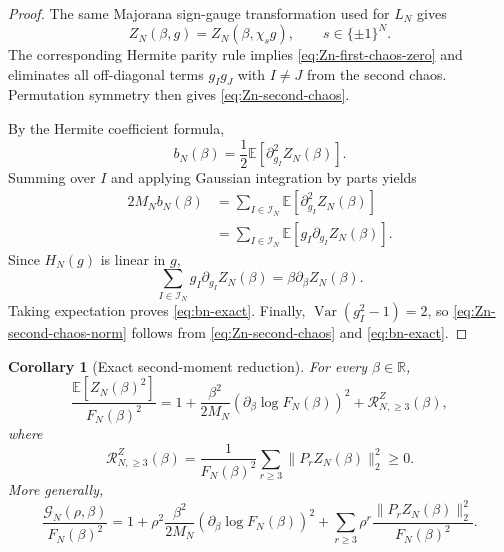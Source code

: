\documentclass[11pt]{article}
\newtheorem{corollary}[proposition]{Corollary}
\newcommand{\E}{\mathbb{E}}
\newcommand{\calI}{\mathcal{I}}
\newcommand{\norm}[1]{\lVert #1\rVert}
\newcommand{\R}{\mathbb{R}}
\DeclareMathOperator{\Var}{Var}
\begin{document}
\begin{proof}
  The same Majorana sign-gauge transformation used for $L_N$ gives
  \begin{equation}\label{eq:Zn-gauge-invariance}
    Z_N(\beta,g)=Z_N(\beta,\chi_sg),
    \qquad s\in\{\pm1\}^N.
  \end{equation}
  The corresponding Hermite parity rule implies
  \eqref{eq:Zn-first-chaos-zero} and eliminates all off-diagonal terms
  $g_Ig_J$ with $I\neq J$ from the second chaos.  Permutation symmetry then
  gives \eqref{eq:Zn-second-chaos}.

  By the Hermite coefficient formula,
  \begin{equation}\label{eq:bn-second-derivative}
    b_N(\beta)
    =
    \frac12\E[\partial_{g_I}^2Z_N(\beta)].
  \end{equation}
  Summing over $I$ and applying Gaussian integration by parts yields
  \begin{equation}\label{eq:bn-gibp}
    \begin{aligned}
      2M_Nb_N(\beta)
      &=
      \sum_{I\in\calI_N}\E[\partial_{g_I}^2Z_N(\beta)]
      \\
      &=
      \sum_{I\in\calI_N}\E[g_I\partial_{g_I}Z_N(\beta)].
    \end{aligned}
  \end{equation}
  Since $H_N(g)$ is linear in $g$,
  \begin{equation}\label{eq:Zn-radial-derivative}
    \sum_{I\in\calI_N}g_I\partial_{g_I}Z_N(\beta)
    =
    \beta\partial_\beta Z_N(\beta).
  \end{equation}
  Taking expectation proves \eqref{eq:bn-exact}.  Finally,
  $\Var(g_I^2-1)=2$, so \eqref{eq:Zn-second-chaos-norm} follows from
  \eqref{eq:Zn-second-chaos} and \eqref{eq:bn-exact}.
\end{proof}

\begin{corollary}[Exact second-moment reduction]
  \label{cor:Zn-exact-second-moment-reduction}
  For every $\beta\in\R$,
  \begin{equation}\label{eq:Zn-exact-second-moment-reduction}
    \frac{\E[Z_N(\beta)^2]}{F_N(\beta)^2}
    =
    1
    +
    \frac{\beta^2}{2M_N}
    \left(
      \partial_\beta\log F_N(\beta)
    \right)^2
    +
    \mathcal R_{N,\geq3}^{Z}(\beta),
  \end{equation}
  where
  \begin{equation}\label{eq:Zn-higher-chaos-remainder}
    \mathcal R_{N,\geq3}^{Z}(\beta)
    =
    \frac1{F_N(\beta)^2}
    \sum_{r\geq3}\norm{P_rZ_N(\beta)}_2^2
    \geq0.
  \end{equation}
  More generally,
  \begin{equation}\label{eq:Zn-rho-exact-reduction}
    \frac{\mathcal G_N(\rho,\beta)}{F_N(\beta)^2}
    =
    1
    +
    \rho^2\frac{\beta^2}{2M_N}
    \left(
      \partial_\beta\log F_N(\beta)
    \right)^2
    +
    \sum_{r\geq3}\rho^r
    \frac{\norm{P_rZ_N(\beta)}_2^2}{F_N(\beta)^2}.
  \end{equation}
\end{corollary}
\end{document}
